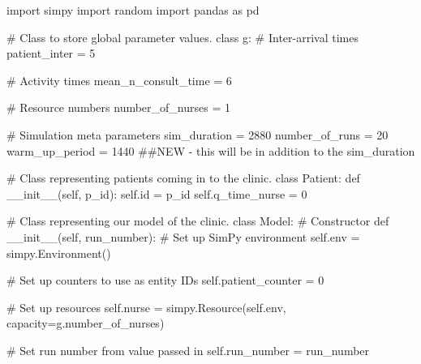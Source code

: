 \documentclass[
  letterpaper,
  DIV=11,
  numbers=noendperiod]{scrreprt}
\newenvironment{Shaded}{\begin{snugshade}}{\end{snugshade}}
\newcommand{\BuiltInTok}[1]{\textcolor[rgb]{0.00,0.23,0.31}{#1}}
\newcommand{\CommentTok}[1]{\textcolor[rgb]{0.37,0.37,0.37}{#1}}
\newcommand{\DecValTok}[1]{\textcolor[rgb]{0.68,0.00,0.00}{#1}}
\newcommand{\FunctionTok}[1]{\textcolor[rgb]{0.28,0.35,0.67}{#1}}
\newcommand{\ImportTok}[1]{\textcolor[rgb]{0.00,0.46,0.62}{#1}}
\newcommand{\KeywordTok}[1]{\textcolor[rgb]{0.00,0.23,0.31}{#1}}
\newcommand{\NormalTok}[1]{\textcolor[rgb]{0.00,0.23,0.31}{#1}}
\newcommand{\OperatorTok}[1]{\textcolor[rgb]{0.37,0.37,0.37}{#1}}
\newcommand{\VariableTok}[1]{\textcolor[rgb]{0.07,0.07,0.07}{#1}}
\begin{document}
\label{code_full_warm_up}
\begin{Shaded}
\begin{Highlighting}[]
\ImportTok{import}\NormalTok{ simpy}
\ImportTok{import}\NormalTok{ random}
\ImportTok{import}\NormalTok{ pandas }\ImportTok{as}\NormalTok{ pd}

\CommentTok{\# Class to store global parameter values.}
\KeywordTok{class}\NormalTok{ g:}
    \CommentTok{\# Inter{-}arrival times}
\NormalTok{    patient\_inter }\OperatorTok{=} \DecValTok{5}

    \CommentTok{\# Activity times}
\NormalTok{    mean\_n\_consult\_time }\OperatorTok{=} \DecValTok{6}

    \CommentTok{\# Resource numbers}
\NormalTok{    number\_of\_nurses }\OperatorTok{=} \DecValTok{1}

    \CommentTok{\# Simulation meta parameters}
\NormalTok{    sim\_duration }\OperatorTok{=} \DecValTok{2880}
\NormalTok{    number\_of\_runs }\OperatorTok{=} \DecValTok{20}
\NormalTok{    warm\_up\_period }\OperatorTok{=} \DecValTok{1440} \CommentTok{\#\#NEW {-} this will be in addition to the sim\_duration}

\CommentTok{\# Class representing patients coming in to the clinic.}
\KeywordTok{class}\NormalTok{ Patient:}
    \KeywordTok{def} \FunctionTok{\_\_init\_\_}\NormalTok{(}\VariableTok{self}\NormalTok{, p\_id):}
        \VariableTok{self}\NormalTok{.}\BuiltInTok{id} \OperatorTok{=}\NormalTok{ p\_id}
        \VariableTok{self}\NormalTok{.q\_time\_nurse }\OperatorTok{=} \DecValTok{0}

\CommentTok{\# Class representing our model of the clinic.}
\KeywordTok{class}\NormalTok{ Model:}
    \CommentTok{\# Constructor}
    \KeywordTok{def} \FunctionTok{\_\_init\_\_}\NormalTok{(}\VariableTok{self}\NormalTok{, run\_number):}
        \CommentTok{\# Set up SimPy environment}
        \VariableTok{self}\NormalTok{.env }\OperatorTok{=}\NormalTok{ simpy.Environment()}

        \CommentTok{\# Set up counters to use as entity IDs}
        \VariableTok{self}\NormalTok{.patient\_counter }\OperatorTok{=} \DecValTok{0}

        \CommentTok{\# Set up resources}
        \VariableTok{self}\NormalTok{.nurse }\OperatorTok{=}\NormalTok{ simpy.Resource(}\VariableTok{self}\NormalTok{.env, capacity}\OperatorTok{=}\NormalTok{g.number\_of\_nurses)}

        \CommentTok{\# Set run number from value passed in}
        \VariableTok{self}\NormalTok{.run\_number }\OperatorTok{=}\NormalTok{ run\_number}


\end{Highlighting}
\end{Shaded}
\end{document}
